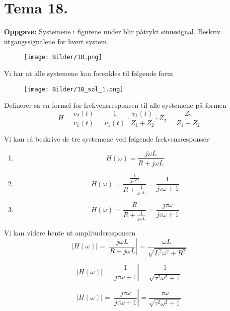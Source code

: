\documentclass[a4paper,11pt,norsk]{article}
\begin{document}
\newpage
\section{Tema 18.}
\begin{question}
    \textbf{Oppgave:}
        Systemene i figurene under blir påtrykt sinussignal. Beskriv utgangssignalene for
        hvert system.

        \begin{figure}[H]
            \centering 
            \texttt{[image: Bilder/18.png]}
        \end{figure}
\end{question}

Vi har at alle systemene kan forenkles til følgende form 
\begin{figure}[H]
    \centering
    \texttt{[image: Bilder/18\_sol\_1.png]}
\end{figure}

Definerer så en formel for frekvensresponsen til alle systemene på formen
\[
    H = \frac{v_2(t)}{v_1(t)} = \frac{1}{v_1(t)} \cdot \frac{v_1(t)}{Z_1 + Z_2} \cdot Z_2 = \frac{Z_2}{Z_1 + Z_2}
\]

Vi kan så beskrive de tre systemene ved følgende frekvensresponser:
\begin{enumerate}[label=\Roman*)]
    \item 
        \[
            H(\omega) = \frac{j \omega L}{R + j \omega L}
        \]
    \item 
        \[
            H(\omega) = \frac{\frac{1}{j \omega C}}{R + \frac{1}{j \omega L}} = \frac{1}{j\tau\omega + 1}
        \]
    \item 
        \[
            H(\omega) = \frac{R}{R + \frac{1}{j \omega L}} = \frac{j\tau\omega}{j\tau\omega + 1}
        \]
\end{enumerate}

Vi kan videre hente ut amplituderesponsen
\begin{equation}
    \left|H(\omega)\right| = \left|\frac{j \omega L}{R + j \omega L}\right| = \frac{\omega L}{\sqrt{L^2\omega^2 + R^2}}
\end{equation}

\begin{equation}
    \left|H(\omega)\right| = \left|\frac{1}{j\tau\omega + 1}\right| = \frac{1}{\sqrt{\tau^2\omega^2 + 1}}
\end{equation}

\begin{equation}
    \left|H(\omega)\right| = \left|\frac{j\tau\omega}{j\tau\omega + 1}\right| = \frac{\tau\omega}{\sqrt{\tau^2\omega^2 + 1}}
\end{equation}
\end{document}
